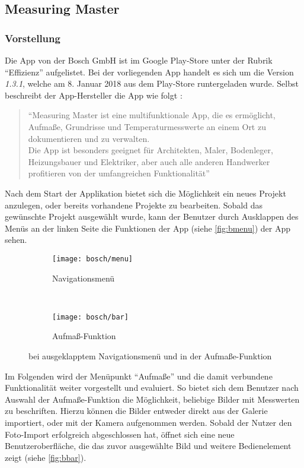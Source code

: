\subsection{Measuring Master}
\subsubsection{Vorstellung}
Die App \mm{} von der Bosch GmbH ist im Google Play-Store unter der Rubrik ``Effizienz'' aufgelistet.
Bei der vorliegenden App handelt es sich um die Version \emph{1.3.1}, welche am 8. Januar 2018 aus dem Play-Store runtergeladen wurde.
Selbst beschreibt der App-Hersteller die App wie folgt \citep{BoschMM}:

\begin{quote}
  ``Measuring Master ist eine multifunktionale App, die es ermöglicht, Aufmaße, Grundrisse und Temperaturmesswerte an einem Ort zu dokumentieren und zu verwalten.\\
  Die App ist besonders geeignet für Architekten, Maler, Bodenleger, Heizungsbauer und Elektriker, aber auch alle anderen Handwerker profitieren von der umfangreichen Funktionalität''
\end{quote}

\noindent
Nach dem Start der Applikation bietet sich die Möglichkeit ein neues Projekt anzulegen, oder bereits vorhandene Projekte zu bearbeiten.
Sobald das gewünschte Projekt ausgewählt wurde, kann der Benutzer durch Ausklappen des Menüs an der linken Seite die Funktionen der App (siehe \autoref{fig:bmenu}) der App sehen. \\

\begin{figure}[h]
  \begin{subfigure}[t]{0.45\textwidth}
    \centering
    \texttt{[image: bosch/menu]}
    \caption{Navigationsmenü}\label{fig:bmenu}	
  \end{subfigure}
  ~
  \begin{subfigure}[t]{0.45\textwidth}
    \centering
    \texttt{[image: bosch/bar]}
    \caption{Aufmaß-Funktion}\label{fig:bbar}
  \end{subfigure}
  \centering
  \caption{\mm{} bei ausgeklapptem Navigationsmenü und in der Aufmaße-Funktion}
\end{figure}

Im Folgenden wird der Menüpunkt ``Aufmaße'' und die damit verbundene Funktionalität weiter vorgestellt und evaluiert.
So bietet sich dem Benutzer nach Auswahl der Aufmaße-Funktion die Möglichkeit, beliebige Bilder mit Messwerten zu beschriften.
Hierzu können die Bilder entweder direkt aus der Galerie importiert, oder mit der Kamera aufgenommen werden.
Sobald der Nutzer den Foto-Import erfolgreich abgeschlossen hat, öffnet sich eine neue Benutzeroberfläche, die das zuvor ausgewählte Bild und weitere Bedienelement zeigt (siehe \autoref{fig:bbar}). \\

